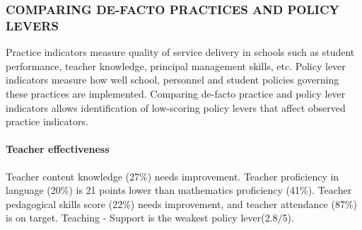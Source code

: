 \documentclass[twocolumn]{article}
\let\oldparagraph\paragraph
\renewcommand{\paragraph}[1]{\oldparagraph{#1}\mbox{}}
\begin{document}
\hypertarget{comparing-de-facto-practices-and-policy-levers}{%
\subsubsection{\texorpdfstring{\textbf{COMPARING DE-FACTO PRACTICES AND
POLICY
LEVERS}}{COMPARING DE-FACTO PRACTICES AND POLICY LEVERS}}\label{comparing-de-facto-practices-and-policy-levers}}

Practice indicators measure quality of service delivery in schools such
as student performance, teacher knowledge, principal management skills,
etc. Policy lever indicators measure how well school, personnel and
student policies governing these practices are implemented. Comparing
de-facto practice and policy lever indicators allows identification of
low-scoring policy levers that affect observed practice indicators.

\hypertarget{teacher-effectiveness}{%
\paragraph{\texorpdfstring{\textbf{Teacher
effectiveness}}{Teacher effectiveness}}\label{teacher-effectiveness}}

Teacher content knowledge (27\%) needs improvement. Teacher proficiency
in language (20\%) is 21 points lower than mathematics proficiency
(41\%). Teacher pedagogical skills score (22\%) needs improvement, and
teacher attendance (87\%) is on target. Teaching - Support is the
weakest policy lever(2.8/5).
\end{document}
